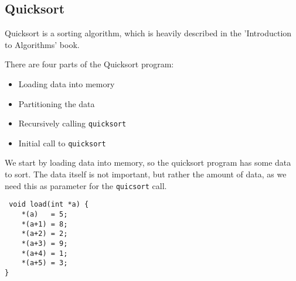 \documentclass{beamer}
\begin{document}
\subsection{Quicksort}
\begin{frame}
    Quicksort is a sorting algorithm, which is heavily described in the
    'Introduction to Algorithms' book.

    \vspace{\baselineskip}
    There are four parts of the Quicksort program:
    \begin{itemize}
        \item Loading data into memory
        \item Partitioning the data
        \item Recursively calling \texttt{quicksort}
        \item Initial call to \texttt{quicksort}
    \end{itemize}
\end{frame}

\begin{frame}[fragile]
    We start by loading data into memory, so the quicksort program has some
    data to sort. The data itself is not important, but rather the amount of
    data, as we need this as parameter for the \texttt{quicsort} call.

\begin{lstlisting}
 void load(int *a) {
    *(a)   = 5;
    *(a+1) = 8;
    *(a+2) = 2;
    *(a+3) = 9;
    *(a+4) = 1;
    *(a+5) = 3;
}
\end{lstlisting}
\end{frame}
\end{document}
